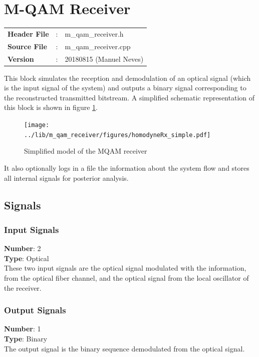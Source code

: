 \clearpage

\section{M-QAM Receiver}\label{lib:homodyneRx}

\begin{tcolorbox}	
	\begin{tabular}{p{2.75cm} p{0.2cm} p{10.5cm}} 	
		\textbf{Header File}   &:& m\_qam\_receiver.h \\
		\textbf{Source File}   &:& m\_qam\_receiver.cpp \\
        \textbf{Version}       &:& 20180815 (Manuel Neves)\\
	\end{tabular}
\end{tcolorbox}

This block simulates the reception and demodulation of an optical
signal (which is the input signal of the system) and outputs a binary signal
corresponding to the reconstructed transmitted bitstream.
 A simplified schematic representation of this block is shown in
figure
\ref{fig:homodyneRx_simple}.

\begin{figure}[h]
	\centering
	\texttt{[image: ../lib/m\_qam\_receiver/figures/homodyneRx\_simple.pdf]}
	\caption{Simplified model of the MQAM
	receiver}\label{fig:homodyneRx_simple}
\end{figure}
It also optionally logs in a file the information about the system flow and stores all internal signals for posterior analysis.

\subsection*{Signals}
\begin{subs}
\subsubsection*{Input Signals}
\end{subs}
\hspace*{0.5in}\textbf{Number}: 2\\
\hspace*{0.5in}\textbf{Type}: Optical
\\
These two input signals are the optical signal modulated with the information, from the optical fiber channel, and the optical signal from the local oscillator of the receiver.
\begin{subs}
\subsubsection*{Output Signals}
\end{subs}
\hspace*{0.5in}\textbf{Number}: 1\\
\hspace*{0.5in}\textbf{Type}: Binary
\\
The output signal is the binary sequence demodulated from the optical signal.



